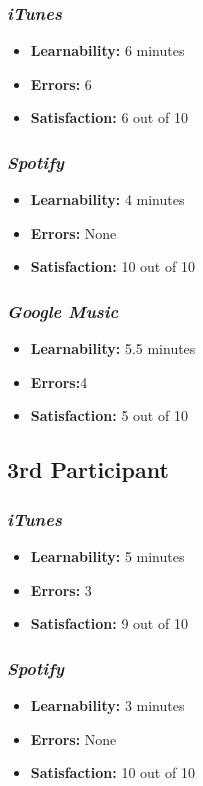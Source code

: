 \documentclass{article}
\begin{document}
{\begin{multicols}{2}
\subsubsection{\it iTunes}
\begin{itemize}
	\item {\bf Learnability:} 6 minutes
	\item {\bf Errors:}  6
	\item {\bf Satisfaction:} 6 out of 10 
\end{itemize}

\subsubsection{\it Spotify}
\begin{itemize}
	\item {\bf Learnability:} 4 minutes
	\item {\bf Errors:} None
	\item {\bf Satisfaction:} 10 out of 10 
\end{itemize}

\subsubsection{\it Google Music}
\begin{itemize}
\item {\bf Learnability:} 5.5 minutes
	\item {\bf Errors:}4 
	\item {\bf Satisfaction:} 5 out of 10 
\end{itemize}

\subsection{3rd Participant}

\subsubsection{\it iTunes}
\begin{itemize}
	\item {\bf Learnability:} 5 minutes
	\item {\bf Errors:}  3
	\item {\bf Satisfaction:} 9 out of 10 
\end{itemize}

\subsubsection{\it Spotify}
\begin{itemize}
	\item {\bf Learnability:} 3 minutes
	\item {\bf Errors:} None
	\item {\bf Satisfaction:} 10 out of 10 
\end{itemize}


\end{multicols}}
\end{document}
